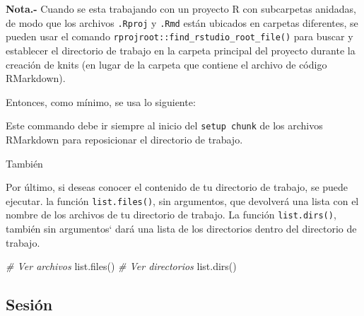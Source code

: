 \documentclass[
]{book}
\newenvironment{Shaded}{\begin{snugshade}}{\end{snugshade}}
\newcommand{\AttributeTok}[1]{\textcolor[rgb]{0.77,0.63,0.00}{#1}}
\newcommand{\CommentTok}[1]{\textcolor[rgb]{0.56,0.35,0.01}{\textit{#1}}}
\newcommand{\FunctionTok}[1]{\textcolor[rgb]{0.00,0.00,0.00}{#1}}
\newcommand{\NormalTok}[1]{#1}
\newcommand{\SpecialCharTok}[1]{\textcolor[rgb]{0.00,0.00,0.00}{#1}}
\newcommand{\StringTok}[1]{\textcolor[rgb]{0.31,0.60,0.02}{#1}}
\begin{document}
\textbf{Nota.-} Cuando se esta trabajando con un proyecto R con subcarpetas anidadas, de modo que los archivos \texttt{.Rproj} y \texttt{.Rmd} están ubicados en carpetas diferentes, se pueden usar el comando \texttt{rprojroot::find\_rstudio\_root\_file()} para buscar y establecer el directorio de trabajo en la carpeta principal del proyecto durante la creación de knits (en lugar de la carpeta que contiene el archivo de código RMarkdown).

Entonces, como mínimo, se usa lo siguiente:

\begin{Shaded}
\end{Shaded}

Este commando debe ir siempre al inicio del \texttt{setup\ chunk} de los archivos RMarkdown para reposicionar el directorio de trabajo.

También

Por último, si deseas conocer el contenido de tu directorio de trabajo, se puede ejecutar. la función \texttt{list.files()}, sin argumentos, que devolverá una lista con el nombre de los archivos de tu directorio de trabajo. La función \texttt{list.dirs()}, también sin argumentos` dará una lista de los directorios dentro del directorio de trabajo.

\begin{Shaded}
\begin{Highlighting}[]
\CommentTok{\# Ver archivos}
\FunctionTok{list.files}\NormalTok{()}
\CommentTok{\# Ver directorios}
\FunctionTok{list.dirs}\NormalTok{()}
\end{Highlighting}
\end{Shaded}

\hypertarget{sesiuxf3n}{%
\subsection{Sesión}\label{sesiuxf3n}}
\end{document}
